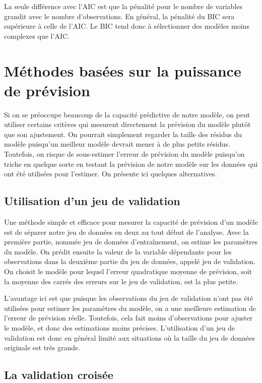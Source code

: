 La seule différence avec l'AIC est que la pénalité pour le nombre de variables grandit avec le nombre d'observations. En général, la pénalité du BIC sera supérieure à celle de l'AIC. Le BIC tend donc à sélectionner des modèles moins complexes que l'AIC.

\section{Méthodes basées sur la puissance de prévision}

Si on se préoccupe beaucoup de la capacité prédictive de notre modèle, on peut utiliser certains critères qui mesurent directement la prévision du modèle plutôt que son ajustement. On pourrait simplement regarder la taille des résidus du modèle puisqu'un meilleur modèle devrait mener à de plus petits résidus. Toutefois, on risque de sous-estimer l'erreur de prévision du modèle puisqu'on triche en quelque sorte en testant la prévision de notre modèle sur les données qui ont été utilisées pour l'estimer. On présente ici quelques alternatives.

\subsection{Utilisation d'un jeu de validation}

Une méthode simple et efficace pour mesurer la capacité de prévision d'un modèle est de séparer notre jeu de données en deux au tout début de l'analyse. Avec la première partie, nommée jeu de données d'entraînement, on estime les paramètres du modèle. On prédit ensuite la valeur de la variable dépendante pour les observations dans la deuxième partie du jeu de données, appelé jeu de validation. On choisit le modèle pour lequel l'erreur quadratique moyenne de prévision, soit la moyenne des carrés des erreurs sur le jeu de validation, est la plus petite.

L'avantage ici est que puisque les observations du jeu de validation n'ont pas été utilisées pour estimer les paramètres du modèle, on a une meilleure estimation de l'erreur de prévision réelle. Toutefois, cela fait moins d'observations pour ajuster le modèle, et donc des estimations moins précises. L'utilisation d'un jeu de validation est donc en général limité aux situations où la taille du jeu de données originale est très grande.

\subsection{La validation croisée}

